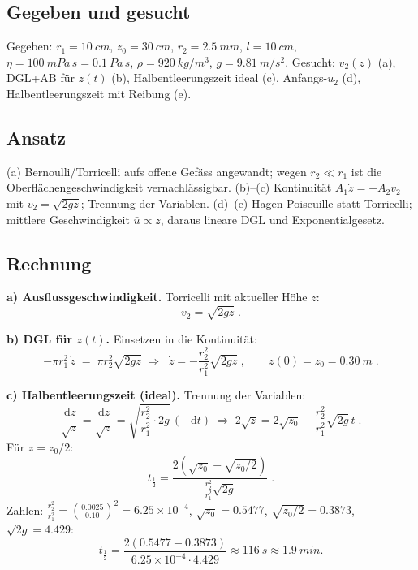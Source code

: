 
\subsection*{Gegeben und gesucht}
Gegeben: $r_1=\qty{10}{cm}$, $z_0=\qty{30}{cm}$, $r_2=\qty{2.5}{mm}$,
$l=\qty{10}{cm}$, $\eta=\qty{100}{mPa\,s}=\qty{0.1}{Pa\,s}$,
$\rho=\qty{920}{kg/m^3}$, $g=\qty{9.81}{m/s^2}$.
Gesucht: $v_2(z)$ (a), DGL+AB für $z(t)$ (b), Halbentleerungszeit ideal (c),
Anfangs-$\bar u_2$ (d), Halbentleerungszeit mit Reibung (e).

\subsection*{Ansatz}
(a) Bernoulli/Torricelli aufs offene Gefäss angewandt; wegen $r_2\ll r_1$ ist
die Oberflächengeschwindigkeit vernachlässigbar. (b)--(c) Kontinuität
$A_1\dot z=-A_2 v_2$ mit $v_2=\sqrt{2gz}$; Trennung der Variablen. (d)--(e)
Hagen-Poiseuille statt Torricelli; mittlere Geschwindigkeit $\bar u\propto z$,
daraus lineare DGL und Exponentialgesetz.

\subsection*{Rechnung}
\textbf{a) Ausflussgeschwindigkeit.} Torricelli mit aktueller Höhe $z$:
\begin{equation}
  v_2=\sqrt{2gz}\;.
\end{equation}

\textbf{b) DGL für $z(t)$.} Einsetzen in die Kontinuität:
\begin{equation}
  -\pi r_1^2\,\dot z \;=\; \pi r_2^2\sqrt{2gz}
  \;\Rightarrow\;
  \boxed{\;\dot z=-\frac{r_2^2}{r_1^2}\sqrt{2gz}\;},\qquad z(0)=z_0=\qty{0.30}{m}\;.
\end{equation}

\textbf{c) Halbentleerungszeit (ideal).} Trennung der Variablen:
\begin{equation}
  \frac{\mathrm dz}{\sqrt z}=\frac{\mathrm{d}z}{\sqrt z}=\sqrt{\frac{r_2^2}{r_1^2}\cdot 2g}\,(-\mathrm dt)
  \;\Rightarrow\;
  2\sqrt z=2\sqrt{z_0}-\frac{r_2^2}{r_1^2}\sqrt{2g}\,t\;.
\end{equation}
Für $z=z_0/2$:
\begin{equation}
  t_{\tfrac12}
  =\frac{2\left(\sqrt{z_0}-\sqrt{z_0/2}\right)}{\frac{r_2^2}{r_1^2}\sqrt{2g}}\;.
\end{equation}
Zahlen: $\frac{r_2^2}{r_1^2}=\left(\frac{0.0025}{0.10}\right)^2=6.25\times10^{-4}$,
$\sqrt{z_0}=0.5477$, $\sqrt{z_0/2}=0.3873$, $\sqrt{2g}=4.429$:
\begin{equation*}
  t_{\tfrac12}=\frac{2(0.5477-0.3873)}{6.25\times10^{-4}\cdot4.429}
  \approx \qty{116}{s}\approx\qty{1.9}{min}.
\end{equation*}

